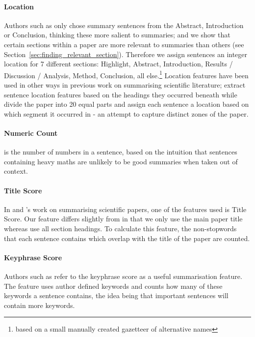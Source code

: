\documentclass[11pt,a4paper]{article}
\begin{document}
\paragraph{Location}
Authors such as  only chose summary sentences from the Abstract, Introduction or Conclusion, thinking these more salient to summaries; and we show that certain sections within a paper are more relevant to summaries than others (see Section~\ref{sec:finding_relevant_section}). Therefore we assign sentences an integer location for 7 different sections: Highlight, Abstract, Introduction, Results / Discussion / Analysis, Method, Conclusion, all else.\footnote{based on a small manually created gazetteer of alternative names} Location features have been used in other ways in previous work on summarising scientific literature;  extract sentence location features based on the headings they occurred beneath while  divide the paper into 20 equal parts and assign each sentence a location based on which segment it occurred in - an attempt to capture distinct zones of the paper. %

\paragraph{Numeric Count}
is the number of numbers in a sentence, based on the intuition that sentences containing heavy maths are unlikely to be good summaries when taken out of context.

\paragraph{Title Score}
In  and 's work on summarising scientific papers, one of the features used is Title Score. Our feature differs slightly from  in that we only use the main paper title whereas  use all section headings. To calculate this feature, the non-stopwords that each sentence contains which overlap with the title of the paper are counted. %

\paragraph{Keyphrase Score}
Authors such as  refer to the keyphrase score as a useful summarisation feature. The feature uses author defined keywords and counts how many of these keywords a sentence contains, the idea being that important sentences will contain more keywords.
\end{document}
